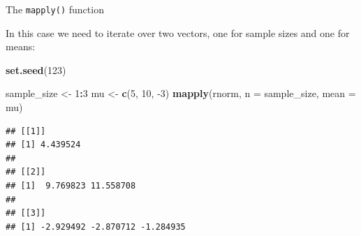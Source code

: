 \documentclass[ignorenonframetext,]{beamer}
\newenvironment{Shaded}{\begin{snugshade}}{\end{snugshade}}
\newcommand{\DataTypeTok}[1]{\textcolor[rgb]{0.13,0.29,0.53}{#1}}
\newcommand{\DecValTok}[1]{\textcolor[rgb]{0.00,0.00,0.81}{#1}}
\newcommand{\KeywordTok}[1]{\textcolor[rgb]{0.13,0.29,0.53}{\textbf{#1}}}
\newcommand{\NormalTok}[1]{#1}
\newcommand{\OperatorTok}[1]{\textcolor[rgb]{0.81,0.36,0.00}{\textbf{#1}}}
\newcommand{\StringTok}[1]{\textcolor[rgb]{0.31,0.60,0.02}{#1}}
\begin{document}
\begin{frame}[fragile]{The \texttt{mapply()} function}
\protect\hypertarget{the-mapply-function-5}{}

In this case we need to iterate over two vectors, one for sample sizes
and one for means:

\begin{Shaded}
\begin{Highlighting}[]
\KeywordTok{set.seed}\NormalTok{(}\DecValTok{123}\NormalTok{)}

\NormalTok{sample_size <-}\StringTok{ }\DecValTok{1}\OperatorTok{:}\DecValTok{3}
\NormalTok{mu <-}\StringTok{ }\KeywordTok{c}\NormalTok{(}\DecValTok{5}\NormalTok{, }\DecValTok{10}\NormalTok{, }\DecValTok{-3}\NormalTok{)}
\KeywordTok{mapply}\NormalTok{(rnorm, }\DataTypeTok{n =}\NormalTok{ sample_size, }\DataTypeTok{mean =}\NormalTok{ mu)}
\end{Highlighting}
\end{Shaded}

\begin{verbatim}
## [[1]]
## [1] 4.439524
## 
## [[2]]
## [1]  9.769823 11.558708
## 
## [[3]]
## [1] -2.929492 -2.870712 -1.284935
\end{verbatim}

\end{frame}
\end{document}
